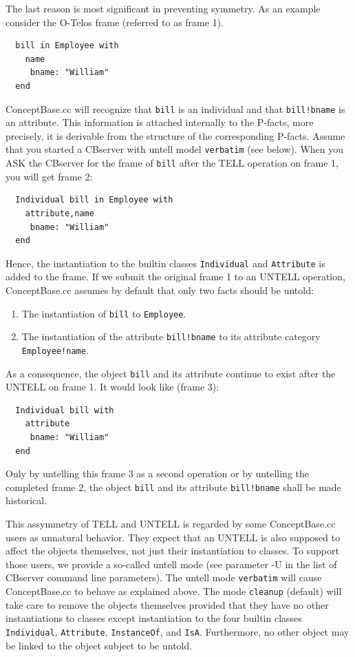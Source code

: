 The last reason is most significant in preventing symmetry. As an example consider the O-Telos 
frame (referred to as frame 1).

\begin{verbatim}
  bill in Employee with
    name
     bname: "William"
  end
\end{verbatim}

ConceptBase.cc will recognize that {\tt bill} is an individual and that {\tt bill!bname} is an
attribute. This information is attached internally to the P-facts, more precisely, it is derivable
from the structure of the corresponding P-facts.
Assume that you started a CBserver with untell model {\tt verbatim} (see below).
When you ASK the CBserver for the frame of {\tt bill}
after the TELL operation on frame 1, you will get frame 2:

\begin{verbatim}
  Individual bill in Employee with
    attribute,name
     bname: "William"
  end
\end{verbatim}

Hence, the instantiation to the builtin classes {\tt Individual} and 
{\tt Attribute} is added to the frame. If we submit the original
frame 1 to an UNTELL operation, ConceptBase.cc assumes by default that only two facts should be untold:

\begin{enumerate}
\item The instantiation of {\tt bill} to {\tt Employee}.
\item The instantiation of the attribute {\tt bill!bname} to its attribute category {\tt Employee!name}.
\end{enumerate}

As a consequence, the object {\tt bill} and its attribute continue to exist after the UNTELL on frame 1.
It would look like (frame 3):

\begin{verbatim}
  Individual bill with
    attribute
     bname: "William"
  end
\end{verbatim}

Only by untelling this frame 3 as a second operation or by untelling the completed frame 2, the
object {\tt bill} and its attribute {\tt bill!bname} shall be made historical.

This assymmetry of TELL and UNTELL is regarded by some ConceptBase.cc users as unnatural behavior.
They expect that an UNTELL is also supposed to affect the objects themselves, not just their
instantiation to classes. To support those users, we provide a so-called untell mode (see parameter
-U in the list of CBserver command line parameters). The untell mode {\tt verbatim} will cause
ConceptBase.cc to behave as explained above. 
The mode {\tt cleanup} (default) will take care to remove the objects themselves
provided that they have no other instantiations to classes except instantiation to the four
builtin classes {\tt Individual}, {\tt Attribute}, {\tt InstanceOf}, and {\tt IsA}. Furthermore,
no other object may be linked to the object subject to be untold. 

